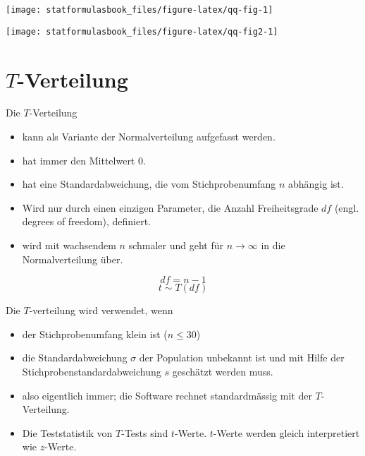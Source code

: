 \documentclass[
]{book}
\providecommand{\tightlist}{%
  \setlength{\itemsep}{0pt}\setlength{\parskip}{0pt}}
\begin{document}
\begin{center}\texttt{[image: statformulasbook\_files/figure-latex/qq-fig-1]} \end{center}

\begin{center}\texttt{[image: statformulasbook\_files/figure-latex/qq-fig2-1]} \end{center}

\hypertarget{t-verteilung}{%
\section{\texorpdfstring{\(T\)-Verteilung}{T-Verteilung}}\label{t-verteilung}}

Die \(T\)-Verteilung

\begin{itemize}
\tightlist
\item
  kann als Variante der Normalverteilung aufgefasst werden.\\
\item
  hat immer den Mittelwert 0.\\
\item
  hat eine Standardabweichung, die vom Stichprobenumfang \(n\) abhängig ist.\\
\item
  Wird nur durch einen einzigen Parameter, die Anzahl Freiheitsgrade \(df\) (engl. degrees of freedom), definiert.\\
\item
  wird mit wachsendem \(n\) schmaler und geht für \(n \rightarrow \infty\) in die Normalverteilung über.
\end{itemize}

\[df = n-1\]
\[t \sim T(df)\]

Die \(T\)-verteilung wird verwendet, wenn

\begin{itemize}
\tightlist
\item
  der Stichprobenumfang klein ist (\(n \leq 30\))\\
\item
  die Standardabweichung \(\sigma\) der Population unbekannt ist und mit Hilfe der Stichprobenstandardabweichung \(s\) geschätzt werden muss.
\item
  also eigentlich immer; die Software rechnet standardmässig mit der \(T\)-Verteilung.\\
\item
  Die Teststatistik von \(T\)-Tests sind \(t\)-Werte. \(t\)-Werte werden gleich interpretiert wie \(z\)-Werte.
\end{itemize}
\end{document}
